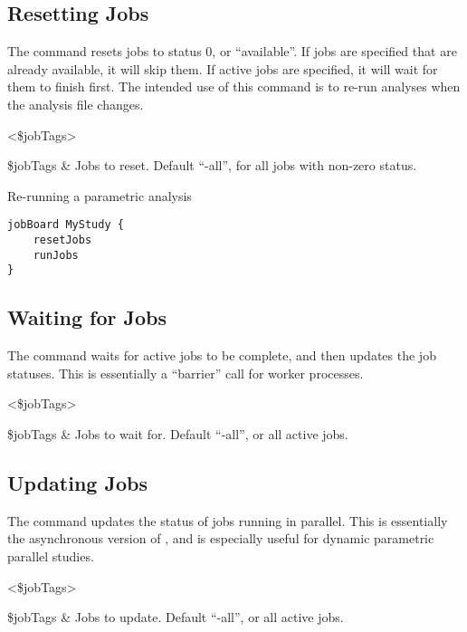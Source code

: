 \documentclass{article}
\renewcommand{\^}[1]{\textsuperscript{#1}}
\renewcommand{\_}[1]{\textsubscript{#1}}
\begin{document}
\subsection{Resetting Jobs}
The command  resets jobs to status 0, or ``available''. 
If jobs are specified that are already available, it will skip them.
If active jobs are specified, it will wait for them to finish first.
The intended use of this command is to re-run analyses when the analysis file changes.
\begin{syntax}
 <\$jobTags>
\end{syntax}
\begin{args}
\$jobTags & Jobs to reset. Default ``-all'', for all jobs with non-zero status.
\end{args}
\begin{example}{Re-running a parametric analysis}
\begin{lstlisting}
jobBoard MyStudy {
    resetJobs
    runJobs
}
\end{lstlisting}
\end{example}

\clearpage

\subsection{Waiting for Jobs}
The command  waits for active jobs to be complete, and then updates the job statuses.
This is essentially a ``barrier'' call for worker processes.
\begin{syntax}
 <\$jobTags>
\end{syntax}
\begin{args}
\$jobTags & Jobs to wait for. Default ``-all'', or all active jobs.
\end{args}

\subsection{Updating Jobs}
The command  updates the status of jobs running in parallel.
This is essentially the asynchronous version of , and is especially useful for dynamic parametric parallel studies.
\begin{syntax}
 <\$jobTags>
\end{syntax}
\begin{args}
\$jobTags & Jobs to update. Default ``-all'', or all active jobs.
\end{args}
\end{document}
